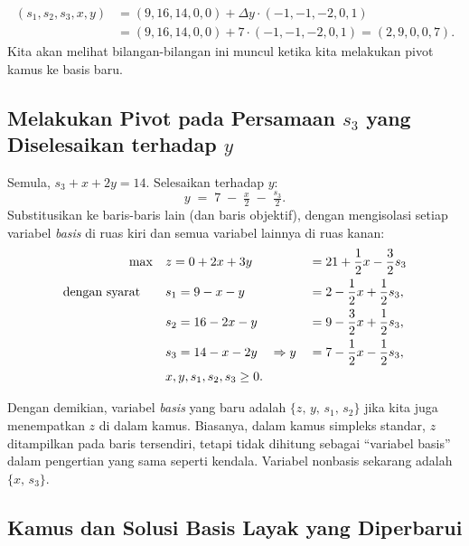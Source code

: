 \begin{align*}
 (s_1, s_2, s_3, x,y) &= (9,16,14,0,0) + \Delta y \cdot (-1, -1, -2, 0,1)\\
 &= (9,16,14,0,0) + 7\cdot (-1, -1, -2, 0,1)  = (2,9,0,0,7).
\end{align*}
Kita akan melihat bilangan-bilangan ini muncul ketika kita melakukan pivot kamus ke basis baru.

\subsection*{Melakukan Pivot pada Persamaan \(s_3\) yang Diselesaikan terhadap \(y\)}

Semula, \(s_3 + x + 2y = 14\). Selesaikan terhadap \(y\):
\[
y \;=\; 7 \;-\; \tfrac{x}{2} \;-\; \tfrac{s_3}{2}.
\]
Substitusikan ke baris-baris lain (dan baris objektif), dengan mengisolasi setiap variabel \emph{basis} di ruas kiri dan semua variabel lainnya di ruas kanan:
\[
\begin{aligned}
\max\quad 
& z = 0+ 2x + 3y \quad && = 21 + \frac{1}{2}x - \frac{3}{2}s_3 \\
\mbox{dengan syarat}\quad\quad 
& s_1 = 9 - x - y \quad && = 2 - \frac{1}{2}x + \frac{1}{2}s_3, \\
& s_2 = 16 - 2x - y \quad &&= 9 - \frac{3}{2}x + \frac{1}{2}s_3, \\
& s_3 = 14 - x - 2y \quad \Rightarrow y &&= 7 - \frac{1}{2}x - \frac{1}{2}s_3, \\
& x, y, s_1, s_2, s_3 \ge 0.
\end{aligned}
\]

\noindent
Dengan demikian, variabel \emph{basis} yang baru adalah \(\{z,\,y,\,s_1,\,s_2\}\) jika kita juga menempatkan \(z\) di dalam kamus. Biasanya, dalam kamus simpleks standar, \(z\) ditampilkan pada baris tersendiri, tetapi tidak dihitung sebagai ``variabel basis'' dalam pengertian yang sama seperti kendala. Variabel nonbasis sekarang adalah \(\{x,\,s_3\}\).

\subsection*{Kamus dan Solusi Basis Layak yang Diperbarui}

